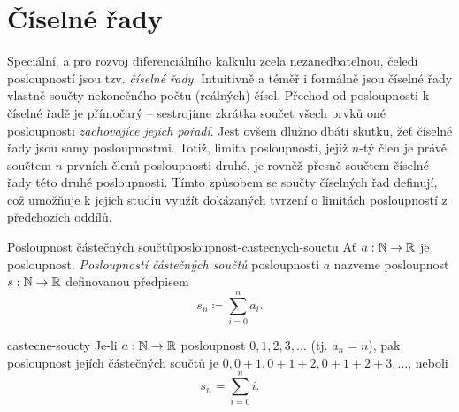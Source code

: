 \section{Číselné řady}
\label{sec:ciselne-rady}

Speciální, a pro rozvoj diferenciálního kalkulu zcela nezanedbatelnou, čeledí
posloupností jsou tzv. \emph{číselné řady}. Intuitivně a téměř i formálně jsou
číselné řady vlastně součty nekonečného počtu (reálných) čísel. Přechod od
posloupnosti k číselné řadě je přímočarý -- sestrojíme zkrátka součet všech
prvků oné posloupnosti \emph{zachovajíce jejich pořadí}. Jest ovšem dlužno dbáti
skutku, žeť číselné řady jsou samy posloupnostmi. Totiž, limita posloupnosti,
jejíž $n$-tý člen je právě součtem $n$ prvních členů posloupnosti druhé, je
rovněž přesně součtem číselné řady této druhé posloupnosti. Tímto způsobem se
součty číselných řad definují, což umožňuje k jejich studiu využít dokázaných
tvrzení o limitách posloupností z předchozích oddílů.

\begin{definition}{Posloupnost částečných součtů}{posloupnost-castecnych-souctu}
 Ať $a:\mathbb{N} \to \mathbb{R}$ je posloupnost. \emph{Posloupností částečných součtů}
 posloupnosti $a$ nazveme posloupnost $s:\mathbb{N} \to \mathbb{R}$ definovanou předpisem
 \[
  s_n \coloneqq \sum_{i = 0}^{n} a_i.
 \]
\end{definition}

\begin{example}{}{castecne-soucty}
 Je-li $a:\mathbb{N} \to \mathbb{R}$ posloupnost $0,1,2,3,\ldots$ (tj. $a_n = n$), pak
 posloupnost jejích částečných součtů je $0,0+1,0+1+2,0+1+2+3,\ldots$, neboli
 \[
  s_n = \sum_{i=0}^{n} i.
 \]
\end{example}

